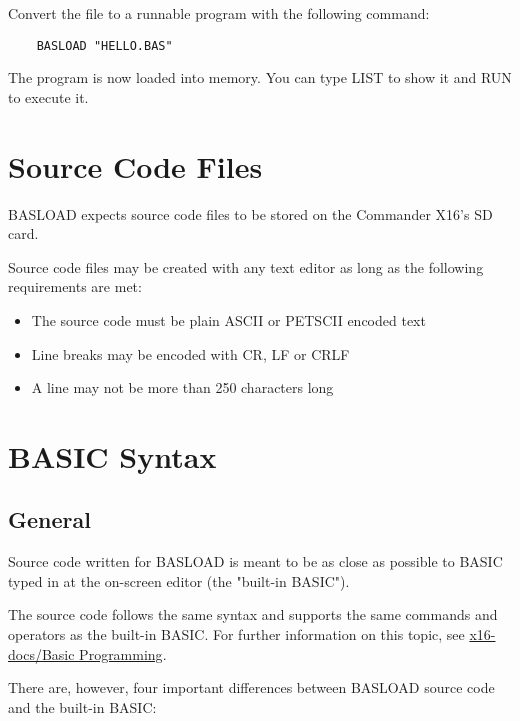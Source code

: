 \documentclass{article}
\begin{document}
    Convert the file to a runnable program with the following
    command:

    \begin{verbatim}
    BASLOAD "HELLO.BAS"
    \end{verbatim}

    The program is now loaded into memory. You can type LIST to
    show it and RUN to execute it.

\section{Source Code Files}

    BASLOAD expects source code files to be stored on the 
    Commander X16's SD card.

    Source code files may be created with any text editor as
    long as the following requirements are met:

    \begin{itemize}
        \item The source code must be plain ASCII or PETSCII encoded text
        \item Line breaks may be encoded with CR, LF or CRLF
        \item A line may not be more than 250 characters long
    \end{itemize}

\section{BASIC Syntax}

    \subsection{General}

        Source code written for BASLOAD is meant to be as close as
        possible to BASIC typed in at the on-screen editor
        (the "built-in BASIC").

        The source code follows the same syntax and supports the
        same commands and operators as the built-in
        BASIC. For further information on this topic, see
        \href{https://github.com/X16Community/x16-docs/blob/master/X16%20Reference%20-%2003%20-%20BASIC.md}
        {x16-docs/Basic Programming}.

        There are, however, four important differences between
        BASLOAD source code and the built-in BASIC:
\end{document}
